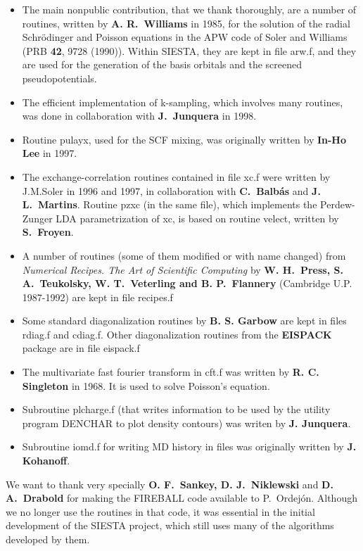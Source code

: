 \begin{itemize}
\item
The main nonpublic contribution, that we thank thoroughly, are a number 
of routines, written by {\bf A. R.\ Williams} in 1985, for the solution 
of the radial Schr\"odinger and Poisson equations in the APW code of 
Soler and Williams (PRB {\bf 42}, 9728 (1990)).
Within SIESTA, they are kept in file arw.f, and they are used for the 
generation of the basis orbitals and the screened pseudopotentials.
\item
The efficient implementation of k-sampling, which involves many routines, 
was done in collaboration with {\bf J.\ Junquera} in 1998.
\item
Routine pulayx, used for the SCF mixing, was originally written by
{\bf In-Ho Lee} in 1997.
\item
The exchange-correlation routines contained in file xc.f were written
by J.M.Soler in 1996 and 1997, in collaboration with {\bf C.\ Balb\'as} 
and {\bf J. L.\ Martins}.
Routine pzxc (in the same file), which implements the Perdew-Zunger
LDA parametrization of xc, is based on routine velect, written by
{\bf S.\ Froyen}.
\item
A number of routines (some of them modified or with name changed)
from {\em Numerical Recipes. The Art of Scientific Computing}
by {\bf W. H.\ Press, S. A.\ Teukolsky, W. T.\ Veterling and B. P.\ Flannery}
(Cambridge U.P. 1987-1992) are kept in file recipes.f
\item
Some standard diagonalization routines by {\bf B. S. Garbow} are kept
in files rdiag.f and cdiag.f. Other diagonalization routines from
the {\bf EISPACK} package are in file eispack.f
\item
The multivariate fast fourier transform in cft.f was written by
{\bf R. C. Singleton} in 1968. It is used to solve Poisson's equation.
\item 
Subroutine plcharge.f (that writes information
to be used by the utility program DENCHAR to plot density
contours) was writen by {\bf J. Junquera}. 
\item
Subroutine iomd.f for writing MD history in files was originally written
by {\bf J. Kohanoff}.
\end{itemize}

We want to thank very specially {\bf O. F.\ Sankey, D. J.\ Niklewski} and 
{\bf D. A.\ Drabold} for making the FIREBALL code available to P.\ Ordej\'on. 
Although we no longer use the routines in that code, it 
was essential in the initial development of the SIESTA project,
which still uses many of the algorithms developed by them.

